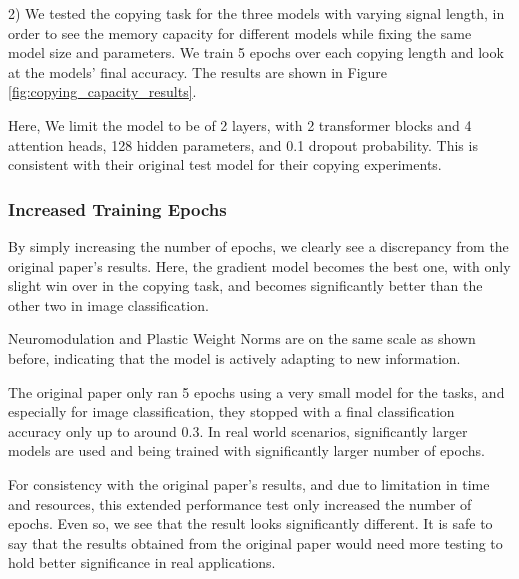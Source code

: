 \documentclass{article}
\begin{document}
2) We tested the copying task for the three models with varying signal length, in order to see the memory capacity for different models while fixing the same model size and parameters. We train 5 epochs over each copying length and look at the models' final accuracy. The results are shown in Figure \ref{fig:copying_capacity_results}. 

Here, We limit the model to be of 2 layers, with 2 transformer blocks and 4 attention heads, 128 hidden parameters, and 0.1 dropout probability. This is consistent with their original test model for their copying experiments.


\subsubsection{Increased Training Epochs}
By simply increasing the number of epochs, we clearly see a discrepancy from the original paper's results. Here, the gradient model becomes the best one, with only slight win over in the copying task, and becomes significantly better than the other two in image classification. 

Neuromodulation and Plastic Weight Norms are on the same scale as shown before, indicating that the model is actively adapting to new information.

The original paper only ran 5 epochs using a very small model for the tasks, and especially for image classification, they stopped with a final classification accuracy only up to around 0.3. In real world scenarios, significantly larger models are used and being trained with significantly larger number of epochs. 

For consistency with the original paper's results, and due to limitation in time and resources, this extended performance test only increased the number of epochs. Even so, we see that the result looks significantly different. It is safe to say that the results obtained from the original paper would need more testing to hold better significance in real applications. 

\end{document}
